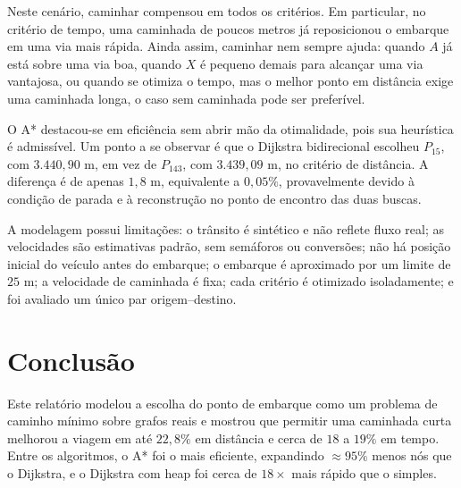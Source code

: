 \documentclass[conference]{IEEEtran}
\begin{document}
Neste cenário, caminhar compensou em todos os critérios. Em particular, no critério de tempo, uma caminhada de poucos metros já reposicionou o embarque em uma via mais rápida. Ainda assim, caminhar nem sempre ajuda: quando $A$ já está sobre uma via boa, quando $X$ é pequeno demais para alcançar uma via vantajosa, ou quando se otimiza o tempo, mas o melhor ponto em distância exige uma caminhada longa, o caso sem caminhada pode ser preferível.

O A* destacou-se em eficiência sem abrir mão da otimalidade, pois sua heurística é admissível. Um ponto a se observar é que o Dijkstra bidirecional escolheu $P_{15}$, com $3.440{,}90$ m, em vez de $P_{143}$, com $3.439{,}09$ m, no critério de distância. A diferença é de apenas $1{,}8$ m, equivalente a $0{,}05\%$, provavelmente devido à condição de parada e à reconstrução no ponto de encontro das duas buscas.

A modelagem possui limitações: o trânsito é sintético e não reflete fluxo real; as velocidades são estimativas padrão, sem semáforos ou conversões; não há posição inicial do veículo antes do embarque; o embarque é aproximado por um limite de $25$ m; a velocidade de caminhada é fixa; cada critério é otimizado isoladamente; e foi avaliado um único par origem--destino.

\section{Conclusão}
Este relatório modelou a escolha do ponto de embarque como um problema de caminho mínimo sobre grafos reais e mostrou que permitir uma caminhada curta melhorou a viagem em até $22{,}8\%$ em distância e cerca de $18$ a $19\%$ em tempo. Entre os algoritmos, o A* foi o mais eficiente, expandindo $\approx 95\%$ menos nós que o Dijkstra, e o Dijkstra com heap foi cerca de $18\times$ mais rápido que o simples. 
\end{document}

